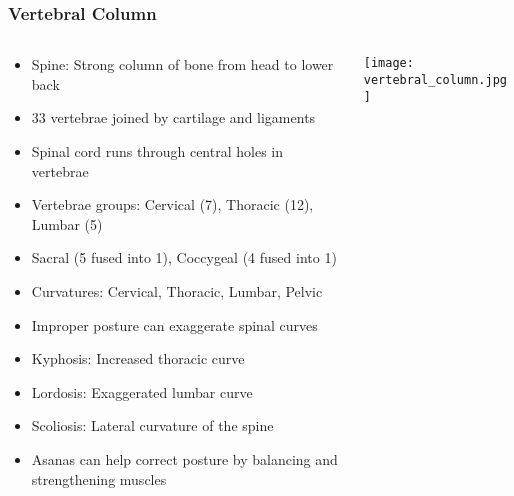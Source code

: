 \begin{frame}[fragile]\frametitle{Vertebral Column}
\begin{columns}
    \begin{column}[T]{0.65\linewidth}
      \begin{itemize}
		\item Spine: Strong column of bone from head to lower back
		\item 33 vertebrae joined by cartilage and ligaments
		\item Spinal cord runs through central holes in vertebrae
		\item Vertebrae groups: Cervical (7), Thoracic (12), Lumbar (5)
		\item Sacral (5 fused into 1), Coccygeal (4 fused into 1)
		\item Curvatures: Cervical, Thoracic, Lumbar, Pelvic
		\item Improper posture can exaggerate spinal curves
		\item Kyphosis: Increased thoracic curve
		\item Lordosis: Exaggerated lumbar curve
		\item Scoliosis: Lateral curvature of the spine
		\item Asanas can help correct posture by balancing and strengthening muscles
	  \end{itemize}
    \end{column}
    \begin{column}[T]{0.35\linewidth}
		\begin{center}
		\texttt{[image: vertebral\_column.jpg]} 
		\end{center}	
    \end{column}
  \end{columns}
\end{frame}

